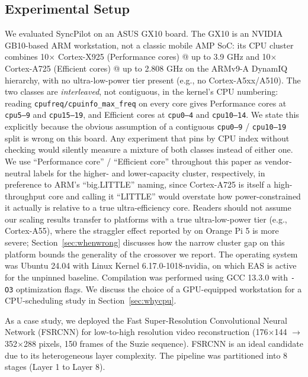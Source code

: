 \documentclass[conference]{IEEEtran}
\begin{document}
\subsection{Experimental Setup}
\label{sec:setup}
We evaluated SyncPilot on an ASUS GX10 board. The GX10 is an NVIDIA GB10-based ARM workstation, not a classic mobile AMP SoC: its CPU cluster combines 10$\times$ Cortex-X925 (Performance cores) @ up to 3.9 GHz and 10$\times$ Cortex-A725 (Efficient cores) @ up to 2.808 GHz on the ARMv9-A DynamIQ hierarchy, with no ultra-low-power tier present (e.g., no Cortex-A5xx/A510). The two classes are \emph{interleaved}, not contiguous, in the kernel's CPU numbering: reading \texttt{cpufreq/cpuinfo\_max\_freq} on every core gives Performance cores at \texttt{cpu5--9} and \texttt{cpu15--19}, and Efficient cores at \texttt{cpu0--4} and \texttt{cpu10--14}. We state this explicitly because the obvious assumption of a contiguous \texttt{cpu0--9} / \texttt{cpu10--19} split is wrong on this board. Any experiment that pins by CPU index without checking would silently measure a mixture of both classes instead of either one. We use ``Performance core'' / ``Efficient core'' throughout this paper as vendor-neutral labels for the higher- and lower-capacity cluster, respectively, in preference to ARM's ``big.LITTLE'' naming, since Cortex-A725 is itself a high-throughput core and calling it ``LITTLE'' would overstate how power-constrained it actually is relative to a true ultra-efficiency core. Readers should not assume our scaling results transfer to platforms with a true ultra-low-power tier (e.g., Cortex-A55), where the straggler effect reported by \cite{annisa2025fsrcnn} on Orange Pi 5 is more severe; Section~\ref{sec:whenwrong} discusses how the narrow cluster gap on this platform bounds the generality of the crossover we report. The operating system was Ubuntu 24.04 with Linux Kernel 6.17.0-1018-nvidia, on which EAS is active for the unpinned baseline. Compilation was performed using GCC 13.3.0 with \texttt{-O3} optimization flags. We discuss the choice of a GPU-equipped workstation for a CPU-scheduling study in Section~\ref{sec:whycpu}.

As a case study, we deployed the Fast Super-Resolution Convolutional Neural Network (FSRCNN) \cite{dong2016fsrcnn} for low-to-high resolution video reconstruction (176$\times$144 $\rightarrow$ 352$\times$288 pixels, 150 frames of the Suzie sequence). FSRCNN is an ideal candidate due to its heterogeneous layer complexity. The pipeline was partitioned into 8 stages (Layer 1 to Layer 8).
\end{document}
